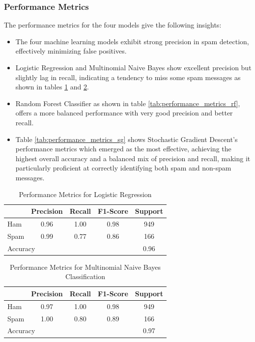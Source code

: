 \documentclass[12pt]{article}
\begin{document}
\subsubsection{Performance Metrics} The performance metrics for the four models give the following insights:
\begin{itemize}
    \item The four machine learning models exhibit strong precision in spam detection, effectively minimizing false positives.
    
    \item Logistic Regression and Multinomial Naive Bayes show excellent precision but slightly lag in recall, indicating a tendency to miss some spam messages as shown in tables \ref{tab:performance_metrics_lr} and \ref{tab:performance_metrics_nb}.
    
    \item Random Forest Classifier as shown in table \ref{tab:performance_metrics_rf}, offers a more balanced performance with very good precision and better recall.
    
    \item Table \ref{tab:performance_metrics_sg} shows Stochastic Gradient Descent's performance metrics which emerged as the most effective, achieving the highest overall accuracy and a balanced mix of precision and recall, making it particularly proficient at correctly identifying both spam and non-spam messages.
\end{itemize}

\begin{table}[!htbp]
\centering
\begin{tabular}{|l|c|c|c|c|}
\hline
          & Precision & Recall & F1-Score & Support \\ \hline
Ham       & 0.96      & 1.00   & 0.98     & 949     \\ \hline
Spam      & 0.99      & 0.77   & 0.86     & 166     \\ \hline
\multicolumn{4}{|l|}{Accuracy}             & 0.96    \\ \hline
\end{tabular}
\caption{Performance Metrics for Logistic Regression}
\label{tab:performance_metrics_lr}
\end{table}

\begin{table}[!htbp]
\centering
\begin{tabular}{|l|c|c|c|c|}
\hline
          & Precision & Recall & F1-Score & Support \\ \hline
Ham       & 0.97      & 1.00   & 0.98     & 949     \\ \hline
Spam      & 1.00      & 0.80   & 0.89     & 166     \\ \hline
\multicolumn{4}{|l|}{Accuracy}             & 0.97    \\ \hline
\end{tabular}
\caption{Performance Metrics for Multinomial Naive Bayes Classification}
\label{tab:performance_metrics_nb}
\end{table}
\end{document}
